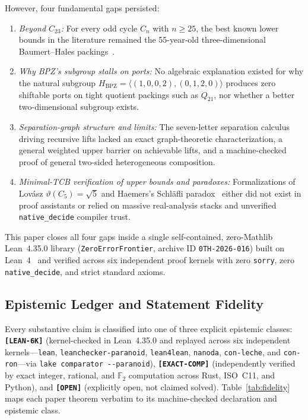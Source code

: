 \documentclass[11pt,reqno]{amsart}
\theoremstyle{definition}
\newcommand{\F}{\mathbb{F}}
\newcommand{\Hbpz}{H_{\mathrm{BPZ}}}
\begin{document}
However, four fundamental gaps persisted:
\begin{enumerate}[leftmargin=2em,itemsep=2pt]
  \item \emph{Beyond $C_{23}$:} For every odd cycle $C_n$ with $n \ge 25$, the best known lower bounds in the literature remained the 55-year-old three-dimensional Baumert--Hales packings~\cite{baumert1971combinatorial,hales1973numerical}.
  \item \emph{Why BPZ's subgroup stalls on ports:} No algebraic explanation existed for why the natural subgroup $\Hbpz = \langle(1,0,0,2),(0,1,2,0)\rangle$ produces zero shiftable ports on tight quotient packings such as $Q_{21}$, nor whether a better two-dimensional subgroup exists.
  \item \emph{Separation-graph structure and limits:} The seven-letter separation calculus driving recursive lifts lacked an exact graph-theoretic characterization, a general weighted upper barrier on achievable lifts, and a machine-checked proof of general two-sided heterogeneous composition.
  \item \emph{Minimal-TCB verification of upper bounds and paradoxes:} Formalizations of Lovász $\vartheta(C_5)=\sqrt{5}$ and Haemers's Schläfli paradox~\cite{haemers1979some} either did not exist in proof assistants or relied on massive real-analysis stacks and unverified \texttt{native\_decide} compiler trust.
\end{enumerate}

This paper closes all four gaps inside a single self-contained, zero-Mathlib Lean~4.35.0 library (\texttt{ZeroErrorFrontier}, archive ID \texttt{0TH-2026-016}) built on Lean~4~\cite{demoura2021lean4} and verified across six independent proof kernels with zero \texttt{sorry}, zero \texttt{native\_decide}, and strict standard axioms.

\subsection*{Epistemic Ledger and Statement Fidelity}

Every substantive claim is classified into one of three explicit epistemic classes:
\textbf{\texttt{[LEAN-6K]}} (kernel-checked in Lean~4.35.0 and replayed across six independent kernels---\texttt{lean}, \texttt{leanchecker-paranoid}, \texttt{lean4lean}, \texttt{nanoda}, \texttt{con-leche}, and \texttt{con-ron}---via \texttt{lake comparator -{}-paranoid}),
\textbf{\texttt{[EXACT-COMP]}} (independently verified by exact integer, rational, and $\F_2$ computation across Rust, ISO~C11, and Python), and
\textbf{\texttt{[OPEN]}} (explicitly open, not claimed solved). Table~\ref{tab:fidelity} maps each paper theorem verbatim to its machine-checked declaration and epistemic class.
\end{document}
